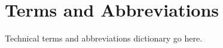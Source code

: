 \thispagestyle{empty}

\section*{Terms and Abbreviations}

Technical terms and abbreviations dictionary go here.
